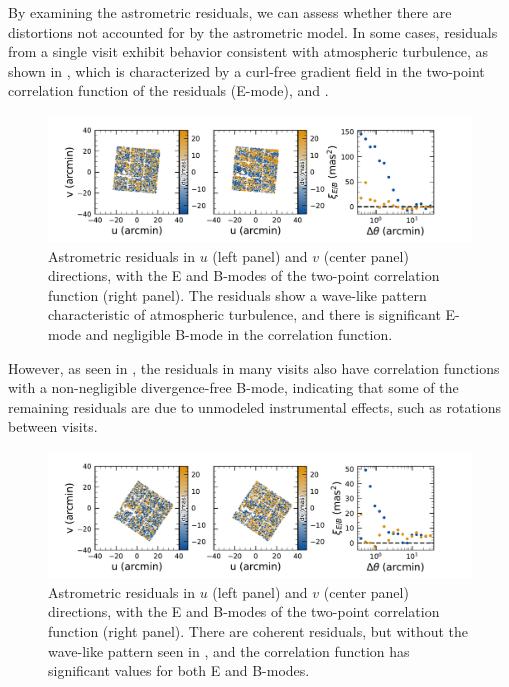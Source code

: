 By examining the astrometric residuals, we can assess whether there are distortions not accounted for by the astrometric model. 
In some cases, residuals from a single visit exhibit behavior consistent with atmospheric turbulence, as shown in , which is characterized by a curl-free gradient field in the two-point correlation function of the residuals (E-mode),  \citet{Leget2021} and \citet{Fortino2021}. 
\begin{figure}[htb!]
\centering
\includegraphics[width=0.98\linewidth]{figures/Astrometry_2024120200359.pdf}
\caption{\small Astrometric residuals in $u$ (left panel) and $v$ (center panel) directions, with the E and B-modes of the two-point correlation function (right panel). 
The residuals show a wave-like pattern characteristic of atmospheric turbulence, and there is significant E-mode and negligible B-mode in the correlation function.}
\label{fig:Astrometry_Emode}
\vspace{0.1cm}
\end{figure}

However, as seen in , the residuals in many visits also have correlation functions with a non-negligible divergence-free B-mode, indicating that some of the remaining residuals are due to unmodeled instrumental effects, such as rotations between visits.
\begin{figure}[htb!]
\centering
\includegraphics[width=0.98\linewidth]{Astrometry_2024120700527.pdf}
\caption{\small Astrometric residuals in $u$ (left panel) and $v$ (center panel) directions, with the E and B-modes of the two-point correlation function (right panel). 
There are coherent residuals, but without the wave-like pattern seen in , and the correlation function has significant values for both E and B-modes.}
\label{fig:Astrometry_EBmode}
\vspace{0.1cm}
\end{figure}

